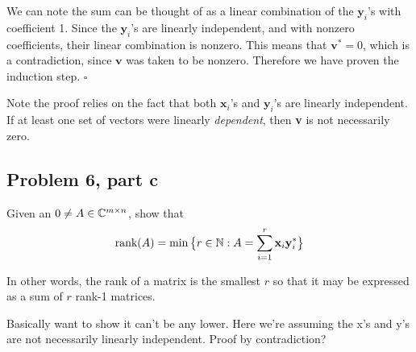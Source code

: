 \begin{solution}
    We can note the sum can be thought of as a linear combination of the $\textbf{y}_i$'s with coefficient 1. Since the $\textbf{y}_i$'s are linearly independent, and with nonzero coefficients, their linear combination is nonzero. This means that $\textbf{v}^* = 0$, which is a contradiction, since $\textbf{v}$ was taken to be nonzero. Therefore we have proven the induction step. $\square$ 

    Note the proof relies on the fact that both $\textbf{x}_i$'s and $\textbf{y}_i$'s are linearly independent. If at least one set of vectors were linearly \textit{dependent}, then \textbf{v} is not necessarily zero. 
\end{solution}

\subsection{Problem 6, part c}
Given an $0 \neq A \in \mathbb{C}^{m\times n}$, show that 
\[
\text{rank}(A) = \min \big\{ r \in \mathbb{N} : A = \sum_{i = 1}^r \textbf{x}_i\textbf{y}_i^*\big\}
\]

In other words, the rank of a matrix is the smallest $r$ so that it may be expressed as a sum of $r$ rank-1 matrices.

\partbreak
\begin{solution}

    Basically want to show it can't be any lower. Here we're assuming the x's and y's are not necessarily linearly independent. Proof by contradiction?
\end{solution}
